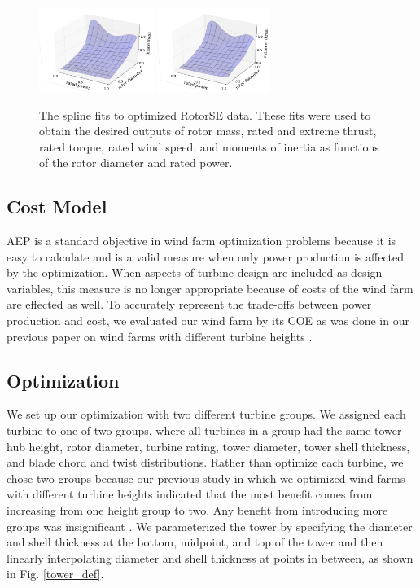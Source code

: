 \documentclass[WESD, manuscript]{copernicus}
\begin{document}
\begin{figure}[htbp]
 \includegraphics[trim={2cm 0 0 0},clip,width=0.33\textwidth]{Figures/blade_mass.pdf}\label{blade_mass}
 \includegraphics[trim={2cm 0 0 0},clip,width=0.33\textwidth]{Figures/extreme_thrust.pdf}\label{extreme_thrust}
  \caption{\label{rotor_nacelle} The spline fits to optimized RotorSE data. These fits were used to obtain the desired outputs of rotor mass, rated and extreme thrust, rated torque, rated wind speed, and moments of inertia as functions of the rotor diameter and rated power.}
\end{figure}

	\subsection{Cost Model}
	
AEP is a standard objective in wind farm optimization problems because it is easy to calculate and is a valid measure when only power production is affected by the optimization. When aspects of turbine design are included as design variables, this measure is no longer appropriate because of costs of the wind farm are effected as well. To accurately represent the trade-offs between power production and cost, we evaluated our wind farm by its COE as was done in our previous paper on wind farms with different turbine heights \citep{stanley2018}.              

	\subsection{Optimization}
	\label{sec:optimization}
	We set up our optimization with two different turbine groups. We assigned each turbine to one of two groups, where all turbines in a group had the same tower hub height, rotor diameter, turbine rating, tower diameter, tower shell thickness, and blade chord and twist distributions.
Rather than optimize each turbine, we chose two groups because our previous study in which we optimized wind farms with different turbine heights indicated that the most benefit comes from increasing from one height group to two. Any benefit from introducing more groups was insignificant \citep{stanley2018}. We parameterized the tower by specifying the diameter and shell thickness at the bottom, midpoint, and top of the tower and then linearly interpolating diameter and shell thickness at points in between, as shown in Fig. \ref{tower_def}.
\end{document}
